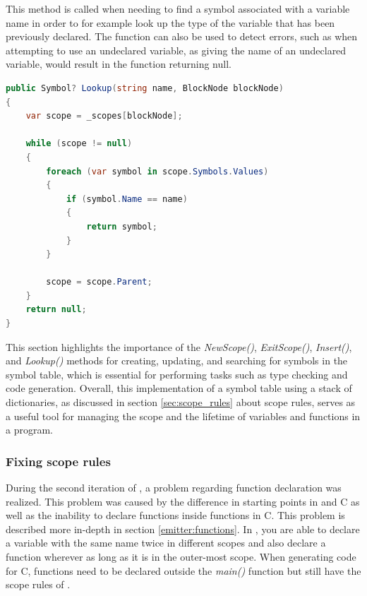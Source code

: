 This method is called when needing to find a symbol associated with a variable name in order to for example look up the type of the variable that has been previously declared. The function can also be used to detect errors, such as when attempting to use an undeclared variable, as giving the name of an undeclared variable, would result in the function returning null.

\begin{lstlisting}[language = csharp, firstnumber=114, label={list:Lookup},caption=Lookup - CobraCompiler/SymbolTable.cs]
public Symbol? Lookup(string name, BlockNode blockNode)
{
    var scope = _scopes[blockNode];

    while (scope != null)
    {
        foreach (var symbol in scope.Symbols.Values)
        {
            if (symbol.Name == name)
            {
                return symbol;
            }
        }
        
        scope = scope.Parent;
    }
    return null;
}
\end{lstlisting}

\noindent
This section highlights the importance of the \textit{NewScope()}, \textit{ExitScope()}, \textit{Insert()}, and \textit{Lookup()} methods for creating, updating, and searching for symbols in the symbol table, which is essential for performing tasks such as type checking and code generation. Overall, this implementation of a symbol table using a stack of dictionaries, as discussed in section \ref{sec:scope_rules} about scope rules, serves as a useful tool for managing the scope and the lifetime of variables and functions in a \lang program.

\subsubsection{Fixing scope rules}
\label{Implementation:SymbolTableScopeFix}
During the second iteration of \lang, a problem regarding function declaration was realized. This problem was caused by the difference in starting points in \lang and C as well as the inability to declare functions inside functions in C. This problem is described more in-depth in section \ref{emitter:functions}. In \lang, you are able to declare a variable with the same name twice in different scopes and also declare a function wherever as long as it is in the outer-most scope. When generating code for C, functions need to be declared outside the \textit{main()} function but still have the scope rules of \lang. \\

